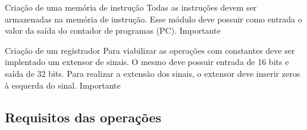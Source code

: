 \documentclass{report}
\begin{document}
\begin{functional}
       \requirement
      {Criação de uma memória de instrução}
      {Todas as instruções devem ser armazenadas na memória de instrução. Esse módulo deve possuir como entrada o valor da saída do contador de programas (PC).}
      {Importante}
      
       \requirement
      {Criação de um registrador }
      {Para viabilizar as operações com constantes deve ser implentado um extensor de sinais. O mesmo deve possuir entrada de 16 bits e saída de 32 bits. Para realizar a extensão dos sinais, o extensor deve inserir zeros à esquerda do sinal.}
      {Importante}
      \end{functional}
      

     \subsection{Requisitos das operações}
\end{document}
